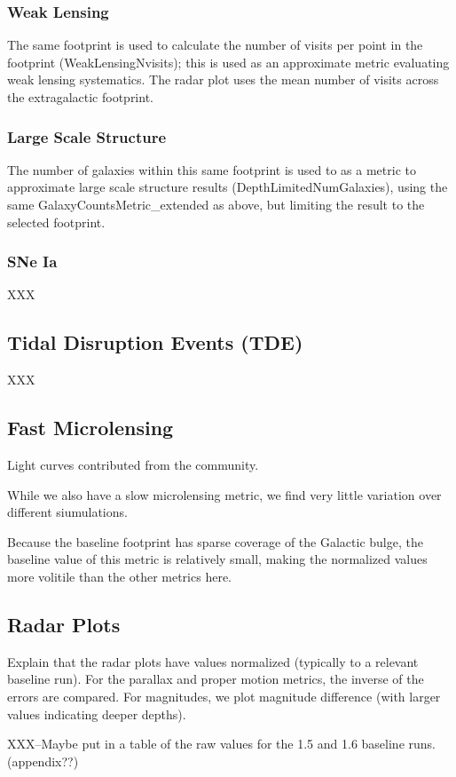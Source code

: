 \subsubsection{Weak Lensing}
The same footprint is used to calculate the number of visits per point in the footprint (WeakLensingNvisits); this is used as an approximate metric evaluating weak lensing systematics.
The radar plot uses the mean number of visits across the extragalactic footprint. 

\subsubsection{Large Scale Structure}
The number of galaxies within this same footprint is used to as a metric to approximate large scale structure results (DepthLimitedNumGalaxies), using the same GalaxyCountsMetric\_extended as above, but limiting the result to the selected footprint. 

\subsubsection{SNe Ia}

XXX

\subsection{Tidal Disruption Events (TDE)}

XXX

\subsection{Fast Microlensing}

Light curves contributed from the community.

While we also have a slow microlensing metric, we find very little variation over different siumulations.

Because the baseline footprint has sparse coverage of the Galactic bulge, the baseline value of this metric is relatively small, making the normalized values more volitile than the other metrics here.


\subsection{Radar Plots}

Explain that the radar plots have values normalized (typically to a relevant baseline run). For the parallax and proper motion metrics, the inverse of the errors are compared. For magnitudes, we plot magnitude difference (with larger values indicating deeper depths).

XXX--Maybe put in a table of the raw values for the 1.5 and 1.6 baseline runs. (appendix??)